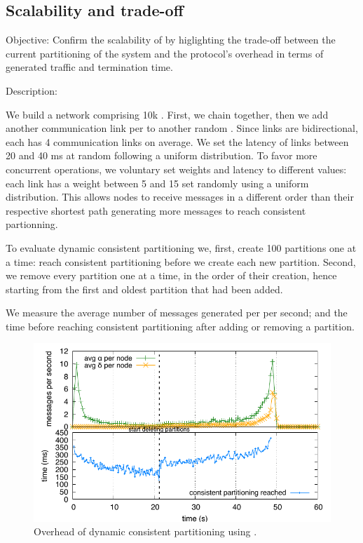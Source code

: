 \subsection{Scalability and trade-off}
\begin{asparadesc}
\item [Objective:] Confirm the scalability of \NAME by higlighting the
  trade-off between the current partitioning of the system and the
  protocol's overhead in terms of generated traffic and termination
  time.
  
\item [Description:]
  
We build a network comprising 10k \processes. First, we chain
\processes together, then we add another communication link per
\process to another random \process. Since links are bidirectional,
each \process has 4 communication links on average. We set the latency
of links between 20 and 40 ms at random following a uniform
distribution.
%
To favor more concurrent operations, we voluntary set
weights and latency to different values: each link has a weight
between 5 and 15 set randomly using a uniform distribution. This
allows nodes to receive messages in a different order than their
respective shortest path generating more messages to reach consistent
partionning.


\noindent To evaluate dynamic consistent partitioning we, first, 
create 100 partitions one at a time: \processes reach consistent
partitioning before we create each new partition. Second, we remove
every partition one at a time, in the order of their creation, hence
starting from the first and oldest partition that had been added.

\noindent We measure the average number of messages generated per
\process per second; and the time before reaching consistent
partitioning after adding or removing a partition.

\begin{figure}
  \centering\includegraphics[width=\FIGSCALE\columnwidth]{img/as_cast_complexity.pdf}
  \caption{\label{fig:complexity}Overhead of dynamic consistent partitioning
    using \NAME.}
  

\end{figure}
\end{asparadesc}
